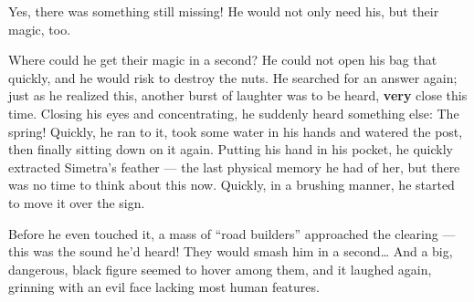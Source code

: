 Yes, there was something still missing! He would not only need his, but their magic, too.

Where could he get their magic in a second? He could not open his bag that quickly, and he would risk to destroy the nuts. He searched for an answer again; just as he realized this, another burst of laughter was to be heard, \textbf{very} close this time. 
Closing his eyes and concentrating, he suddenly heard something else: The spring! Quickly, he ran to it, took some water in his hands and watered the post, then finally sitting down on it again. Putting his hand in his pocket, he quickly extracted Simetra's feather --- the last physical memory he had of her, but there was no time to think about this now. Quickly, in a brushing manner, he started to move it over the sign.

Before he even touched it, a mass of \enquote{road builders} approached the clearing --- this was the sound he'd heard! They would smash him in a second\dots{}
And a big, dangerous, black figure seemed to hover among them, and it laughed again, grinning with an evil face lacking most human features.
